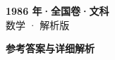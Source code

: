 \documentclass[zihao=-4, a4paper]{ctexart}
\begin{document}
\begin{center}
  {\Large\bfseries 1986 年·全国卷·文科}\\[4pt]
  {\large 数学 · 解析版}
\end{center}
\medskip
{}

\clearpage
{}
\begin{center}{\Large\bfseries 参考答案与详细解析}\end{center}
\medskip

\end{document}
